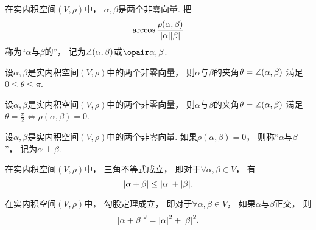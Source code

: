 \begin{definition}
在实内积空间\((V,\rho)\)中，
\(\alpha,\beta\)是两个非零向量.
把\begin{equation}
	\arccos\frac{\rho(\alpha,\beta)}{\abs{\alpha} \abs{\beta}}
\end{equation}
称为“\(\alpha\)与\(\beta\)的”，
记为\(\angle(\alpha,\beta)\)或\(\VectorAngleP{\alpha}{\beta}\).
\end{definition}

\begin{property}
设\(\alpha,\beta\)是实内积空间\((V,\rho)\)中的两个非零向量，
则\(\alpha\)与\(\beta\)的夹角\(\theta = \angle(\alpha,\beta)\)
满足\(0 \leq \theta \leq \pi\).
\end{property}

\begin{property}
设\(\alpha,\beta\)是实内积空间\((V,\rho)\)中的两个非零向量，
则\(\alpha\)与\(\beta\)的夹角\(\theta = \angle(\alpha,\beta)\)
满足\(\theta = \frac\pi2 \iff \rho(\alpha,\beta) = 0\).
\end{property}

\begin{definition}
设\(\alpha,\beta\)是实内积空间\((V,\rho)\)中的两个非零向量.
如果\(\rho(\alpha,\beta) = 0\)，
则称“\(\alpha\)与\(\beta\) ”，
记为\(\alpha \perp \beta\).
\end{definition}

\begin{corollary}
在实内积空间\((V,\rho)\)中，
三角不等式成立，
即对于\(\forall \alpha,\beta \in V\)，
有\begin{equation}
	\abs{\alpha+\beta} \leq \abs{\alpha} + \abs{\beta}.
\end{equation}
\end{corollary}

\begin{corollary}
在实内积空间\((V,\rho)\)中，
勾股定理成立，
即对于\(\forall \alpha,\beta \in V\)，
如果\(\alpha\)与\(\beta\)正交，
则\begin{equation}
	\abs{\alpha+\beta}^2 = \abs{\alpha}^2 + \abs{\beta}^2.
\end{equation}
\end{corollary}

